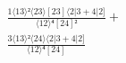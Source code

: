 \documentclass[varwidth, border=5pt]{standalone}
\begin{document}
\begin{my}
$\begin{gathered}
\scriptscriptstyle\frac{1⟨13⟩²⟨23⟩[23]⟨2|3+4|2]}{⟨12⟩⁴[24]²} +\\
\scriptscriptstyle\frac{3⟨13⟩²⟨24⟩⟨2|3+4|2]}{⟨12⟩⁴[24]} \phantom{+}
\end{gathered}$
\end{my}
\end{document}

